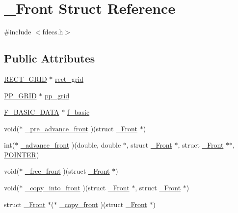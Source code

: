 \hypertarget{struct___front}{}\section{\+\_\+\+Front Struct Reference}
\label{struct___front}


{\ttfamily \#include $<$fdecs.\+h$>$}

\subsection*{Public Attributes}
\begin{DoxyCompactItemize}
\item 
\hyperlink{geom_8h_a983fdb6b46c9b99969bffa62eae7d31d}{R\+E\+C\+T\+\_\+\+G\+R\+ID} $\ast$ \hyperlink{struct___front_aa9476101ba2054e4c50fc28de06b5118}{rect\+\_\+grid}
\item 
\hyperlink{int_8h_d3/d17/struct_p_p___g_r_i_d}{P\+P\+\_\+\+G\+R\+ID} $\ast$ \hyperlink{struct___front_a6f24ab73c5e8b24bd28cb26e9228f4c9}{pp\+\_\+grid}
\item 
\hyperlink{fdecs_8h_aa0691918b7151755ba8c2abfbde73314}{F\+\_\+\+B\+A\+S\+I\+C\+\_\+\+D\+A\+TA} $\ast$ \hyperlink{struct___front_a6b75d1e79a1fe398c2b87f7634598166}{f\+\_\+basic}
\item 
void($\ast$ \hyperlink{struct___front_aa597d640e991439ea0d7656fc072e164}{\+\_\+pre\+\_\+advance\+\_\+front} )(struct \hyperlink{struct___front}{\+\_\+\+Front} $\ast$)
\item 
int($\ast$ \hyperlink{struct___front_a77e8cff41b347b98bdca6de50350d4a9}{\+\_\+advance\+\_\+front} )(double, double $\ast$, struct \hyperlink{struct___front}{\+\_\+\+Front} $\ast$, struct \hyperlink{struct___front}{\+\_\+\+Front} $\ast$$\ast$, \hyperlink{cdecs_8h_ae51a81000f343b8ec43bca1f6a723d7b}{P\+O\+I\+N\+T\+ER})
\item 
void($\ast$ \hyperlink{struct___front_a7feddc0965b3e3d7047d38831701ed1a}{\+\_\+free\+\_\+front} )(struct \hyperlink{struct___front}{\+\_\+\+Front} $\ast$)
\item 
void($\ast$ \hyperlink{struct___front_a068a374981d2bc5a6a04dc6b79616275}{\+\_\+copy\+\_\+into\+\_\+front} )(struct \hyperlink{struct___front}{\+\_\+\+Front} $\ast$, struct \hyperlink{struct___front}{\+\_\+\+Front} $\ast$)
\item 
struct \hyperlink{struct___front}{\+\_\+\+Front} $\ast$($\ast$ \hyperlink{struct___front_a08c405a5134ac96c8c1e3b7808938b25}{\+\_\+copy\+\_\+front} )(struct \hyperlink{struct___front}{\+\_\+\+Front} $\ast$)
$$
\end{DoxyCompactItemize}
